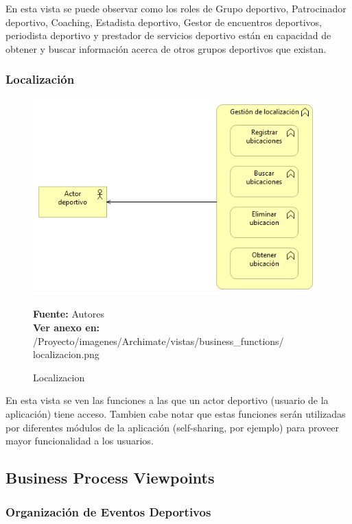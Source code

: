 En esta vista se puede observar como los roles de Grupo deportivo, Patrocinador deportivo, Coaching, Estadista deportivo, Gestor de encuentros deportivos, periodista deportivo y prestador de servicios deportivo están en capacidad de obtener y buscar información acerca de otros grupos deportivos que existan.

\subsubsection{Localización}

\begin{figure}[!htb]
  \begin{center}
    \includegraphics[width=11cm]{./imagenes/Archimate/vistas/business_functions/localizacion.png}
    \caption{Localizacion}
    \label{fig:BF_localizacion}
    \textbf{Fuente:}  Autores \\
    \textbf{Ver anexo en:} /Proyecto/imagenes/Archimate/vistas/business\_functions/
    localizacion.png
  \end{center}
\end{figure}

En esta vista se ven las funciones a las que un actor deportivo (usuario de la aplicación) tiene acceso. Tambien cabe notar que estas funciones serán utilizadas por diferentes módulos de la aplicación (self-sharing, por ejemplo) para proveer mayor funcionalidad a los usuarios.

\subsection{Business Process Viewpoints}

\subsubsection{Organización de Eventos Deportivos}

